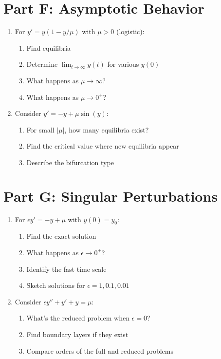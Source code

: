\documentclass[12pt]{article}
\begin{document}
\section*{Part F: Asymptotic Behavior}

\begin{enumerate}[start=17]
    \item For $y' = y(1 - y/\mu)$ with $\mu > 0$ (logistic):
    \begin{enumerate}[label=(\alph*)]
        \item Find equilibria
        \item Determine $\lim_{t \to \infty} y(t)$ for various $y(0)$
        \item What happens as $\mu \to \infty$?
        \item What happens as $\mu \to 0^+$?
    \end{enumerate}
    
    \item Consider $y' = -y + \mu \sin(y)$:
    \begin{enumerate}[label=(\alph*)]
        \item For small $|\mu|$, how many equilibria exist?
        \item Find the critical value where new equilibria appear
        \item Describe the bifurcation type
    \end{enumerate}
\end{enumerate}

\section*{Part G: Singular Perturbations}

\begin{enumerate}[start=19]
    \item For $\epsilon y' = -y + \mu$ with $y(0) = y_0$:
    \begin{enumerate}[label=(\alph*)]
        \item Find the exact solution
        \item What happens as $\epsilon \to 0^+$?
        \item Identify the fast time scale
        \item Sketch solutions for $\epsilon = 1, 0.1, 0.01$
    \end{enumerate}
    
    \item Consider $\epsilon y'' + y' + y = \mu$:
    \begin{enumerate}[label=(\alph*)]
        \item What's the reduced problem when $\epsilon = 0$?
        \item Find boundary layers if they exist
        \item Compare orders of the full and reduced problems
    \end{enumerate}
\end{enumerate}
\end{document}
